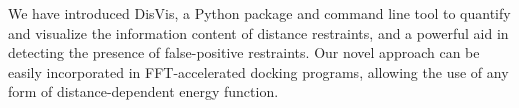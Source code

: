 We have introduced DisVis, a Python package and command line tool to quantify
and visualize the information content of distance restraints, and a powerful
aid in detecting the presence of false-positive restraints. Our novel approach
can be easily incorporated in FFT-accelerated docking programs, allowing the
use of any form of distance-dependent energy function.
